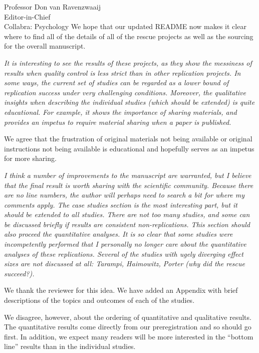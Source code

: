 \documentclass{stanfordletter}
\newcounter{section}
\newcommand{\theysaid}[1]{\begin{leftbar} \noindent 
		\textsl{ #1}\end{leftbar}}
\begin{document}
\begin{letter}{Professor Don van Ravenzwaaij \\ Editor-in-Chief \\ Collabra: Psychology }
	We hope that our updated README now makes it clear where to find all of the details of all of the rescue projects as well as the sourcing for the overall manuscript. 
	
	
	\theysaid{It is interesting to see the results of these projects, as they show the messiness of results when quality control is less strict than in other replication projects. In some ways, the current set of studies can be regarded as a lower bound of replication success under very challenging conditions. Moreover, the qualitative insights when describing the individual studies (which should be extended) is quite educational. For example, it shows the importance of sharing materials, and provides an impetus to require material sharing when a paper is published.}
	
	We agree that the frustration of original materials not being available or original instructions not being available is educational and hopefully serves as an impetus for more sharing. 
	
	\theysaid{ I think a number of improvements to the manuscript are warranted, but I believe that the final result is worth sharing with the scientific community. Because there are no line numbers, the author will perhaps need to search a bit for where my comments apply.
		The case studies section is the most interesting part, but it should be extended to all studies.
		There are not too many studies, and some can be discussed briefly if results are consistent non-replications. This section should also proceed the quantitative analyses. It is so clear that some studies were incompetently performed that I personally no longer care about the quantitative analyses of these replications. Several of the studies with ugely diverging effect sizes are not discussed at all: Tarampi, Haimowitz, Porter (why did the rescue succeed?).}
	
	
	We thank the reviewer for this idea. We have added an Appendix with brief descriptions of the topics and outcomes of each of the studies. 
	
	We disagree, however, about the ordering of quantitative and qualitative results. The quantitative results come directly from our preregistration and so should go first. In addition, we expect many readers will be more interested in the ``bottom line'' results than in the individual studies.
	
	
	

\end{letter}
\end{document}
